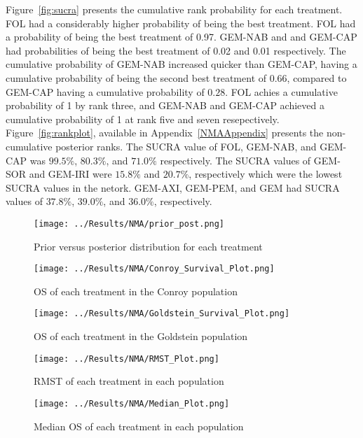 Figure~\ref{fig:sucra} presents the cumulative rank probability for each treatment. FOL had a considerably higher probability of being the best treatment. FOL had a probability of being the best treatment of 0.97. GEM-NAB and and GEM-CAP had probabilities of being the best treatment of 0.02 and 0.01 respectively. The cumulative probability of GEM-NAB increased quicker than GEM-CAP, having a cumulative probability of being the second best treatment of 0.66, compared to GEM-CAP having a cumulative probability of $0.28$. FOL achies a cumulative probability of 1 by rank three, and GEM-NAB and GEM-CAP achieved a cumulative probability of 1 at rank five and seven resepectively. Figure~\ref{fig:rankplot}, available in Appendix~\ref{NMAAppendix} presents the non-cumulative posterior ranks. The SUCRA value of FOL, GEM-NAB, and GEM-CAP was $99.5\%$, $80.3\%$, and $71.0\%$ respectively. The SUCRA values of GEM-SOR and GEM-IRI were $15.8\%$ and $20.7\%$, respectively which were the lowest SUCRA values in the netork. GEM-AXI, GEM-PEM, and GEM had SUCRA values of $37.8\%$, $39.0\%$, and $36.0\%$, respectively. 

\begin{figure}[h]
    \centering
    \texttt{[image: ../Results/NMA/prior\_post.png]}
    \caption{Prior versus posterior distribution for each treatment}
    \label{fig:prior_post}
\end{figure}

\begin{figure}[h]
    \centering
    \texttt{[image: ../Results/NMA/Conroy\_Survival\_Plot.png]}
    \caption{OS of each treatment in the Conroy population}
    \label{fig:pred_survbc_conroy}
\end{figure}

\begin{figure}[h]
    \centering
    \texttt{[image: ../Results/NMA/Goldstein\_Survival\_Plot.png]}
    \caption{OS of each treatment in the Goldstein population}
    \label{fig:pred_survbc_goldstein}
\end{figure}

\begin{figure}[h]
    \centering
    \texttt{[image: ../Results/NMA/RMST\_Plot.png]}
    \caption{RMST of each treatment in each population}
    \label{fig:pred_rmstbc}
\end{figure}

\begin{figure}[h]
    \centering
    \texttt{[image: ../Results/NMA/Median\_Plot.png]}
    \caption{Median OS of each treatment in each population}
    \label{fig:pred_medianbc}
\end{figure}

